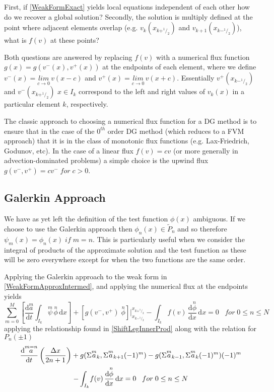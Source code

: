 \documentclass[letterpaper]{article}
\begin{document}
First, if \eqref{WeakFormExact} yields local equations independent of each other how do we recover a global solution? Secondly, the solution is multiply defined at the point where adjacent elements overlap (e.g. $v_k(x_{k+^1\!/_2})$ and $v_{k+1}(x_{k-^1\!/_2})$\;), what is $f(v)$ at these points?

Both questions are answered by replacing $f(v)$ with a numerical flux function $g(x) = g(v^-(x),v^+(x))$ at the endpoints of each element, where we define $v^-(x) = \underset{c \to 0}{lim} \,v(x-c)$ and $v^+(x) = \underset{c \to 0}{lim} \,v(x+c)$. Essentially $v^+(x_{k-^1\!/_2})$ and $v^-(x_{k+^1\!/_2})$ $x \in I_k$ correspond to the left and right values of $v_k(x)$ in a particular element $k$, respectively.

The classic approach to choosing a numerical flux function for a DG method is to ensure that in the case of the $0^{th}$ order DG method (which reduces to a FVM approach) that it is in the class of monotonic flux functions (e.g. Lax-Friedrich, Godunov, etc). In the case of a linear flux $f(v) = cv$ (or more generally in advection-dominated problems) a simple choice is the upwind flux $g(v^-,v^+) = cv^- \;for\; c>0$.

\subsection{Galerkin Approach}
We have as yet left the definition of the test function $\phi(x)$ ambiguous. If we choose to use the Galerkin approach then $\phi_n(x) \in \tilde{P}_n$ and so therefore $\psi_m(x) = \phi_n(x) \;if\; m=n$. This is particularly useful when we consider the integral of products of the approximate solution and the test function as these will be zero everywhere except for when the two functions are the same order.

Applying the Galerkin approach to the weak form in \eqref{WeakFormApproxIntermed}, and applying the numerical flux at the endpoints yields
	\begin{equation}\label{WeakFormNumFluxIntermed}
	\sum_{m=0}^M \left[ \frac{\mathrm{d}\overset{m}{a}}{\mathrm{d} t} \int_{I_k}\! \overset{m}{\psi} \, \overset{n}{\phi} \,\mathrm{d}x \right] + 
	[g(v^-,v^+) \; \overset{n}{\phi}] \Big\rvert_{x_{k-^1\!/_2}}^{x_{k+^1\!/_2}} -  
	\int_{I_k}\! f(v) \,\frac{\mathrm{d} \overset{n}{\phi}}{\mathrm{d} x} \,\mathrm{d}x = 0
	\;\;\; for \; 0 \leq n \leq N
	\end{equation}
applying the relationship found in \eqref{ShiftLegInnerProd} along with the relation for $P_n(\pm 1)$
	\begin{gather}\label{WeakFormNumFlux}
	\frac{\mathrm{d}\overset{m=n}{a}}{\mathrm{d} t}\left(\frac{\Delta x}{2n+1}\right)
	+ g(\Sigma \overset{m}{a}_k,\Sigma \overset{m}{a}_{k+1}(-1)^m) - g(\Sigma \overset{m}{a}_{k-1},\Sigma \overset{m}{a}_{k}(-1)^m) (-1)^m\\
	- \int_{I_k}\! f(v) \,\frac{\mathrm{d} \overset{n}{\phi}}{\mathrm{d} x} \,\mathrm{d}x = 0
	\;\;\; for \; 0 \leq n \leq N \notag
	\end{gather}
\end{document}
